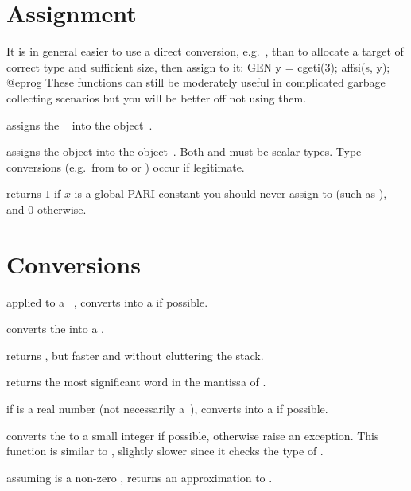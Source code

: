 \section{Assignment}

It is in general easier to use a direct conversion,
e.g.~, than to allocate a target of correct type and
sufficient size, then assign to it:
\bprog
  GEN y = cgeti(3); affsi(s, y);
@eprog\noindent
These functions can still be moderately useful in complicated garbage
collecting scenarios but you will be better off not using them.

 assigns the ~ into the
object~.

 assigns the object  into the
object~. Both  and  must be scalar types. Type
conversions (e.g.~from  to  or ) occur if
legitimate.

 returns $1$ if $x$ is a global PARI
constant you should never assign to (such as ), and $0$
otherwise.

\section{Conversions}


 applied to a ~, converts 
into a  if possible.

 converts the   into a
.

 returns , but
faster and without cluttering the stack.

 returns the most significant word
in the mantissa of .

 if  is a real number (not necessarily
a~), converts  into a  if possible.

 converts the   to a small
integer if possible, otherwise raise an exception. This function
is similar to , slightly slower since it checks the type of .

 assuming  is a non-zero ,
returns an approximation to .

